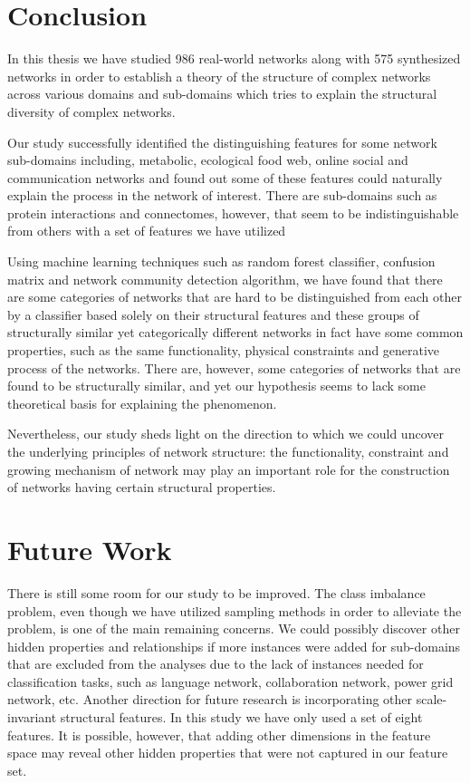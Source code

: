 \documentclass{article}
\begin{document}
 

 \section{Conclusion}
 In this thesis we have studied 986 real-world networks along with 575 synthesized networks in order to establish a  theory of the structure of complex networks across various domains and sub-domains which tries to explain the structural diversity of complex networks.
 
  Our study successfully identified the distinguishing features for some network sub-domains including, metabolic, ecological food web, online social and communication networks and found out some of these features could naturally explain the process in the network of interest. There are sub-domains such as protein interactions and connectomes, however, that seem to be indistinguishable from others with a set of features we have utilized 
  
  Using machine learning techniques such as random forest classifier, confusion matrix and network community detection algorithm, we have found that there are some categories of networks that are hard to be distinguished from each other by a classifier based solely on their structural features and these groups of structurally similar yet categorically different networks in fact have some common properties, such as the same functionality, physical constraints and generative process of the networks. There are, however, some categories of networks that are found to be structurally similar, and yet our hypothesis seems to lack some theoretical basis for explaining the phenomenon.
 
 Nevertheless, our study sheds light on the direction to which we could uncover the underlying principles of network structure: the functionality, constraint and growing mechanism of network may play an important role for the construction of networks having certain structural properties.
 
 

\section{Future Work}
There is still some room for our study to be improved. The class imbalance problem, even though we have utilized sampling methods in order to alleviate the problem, is one of the main remaining concerns. We could possibly discover other hidden properties and relationships if more instances were added for sub-domains that are excluded from the analyses due to the lack of instances needed for classification tasks, such as language network, collaboration network, power grid network, etc. Another direction for future research is incorporating other scale-invariant structural features. In this study we have only used a set of eight features. It is possible, however, that adding other dimensions in the feature space may reveal other hidden properties that were not captured in our feature set. 
\end{document}
